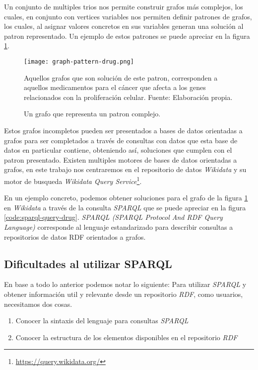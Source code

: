 Un conjunto de multiples trios nos permite construir grafos más complejos, los cuales, en conjunto con vertices variables nos permiten definir patrones de grafos, los cuales, al asignar valores concretos en sus variables generan una solución al patron representado. Un ejemplo de estos patrones se puede apreciar en la figura \ref{fig:rdf-graph-pattern-drug}.

\begin{figure}[ht]
    \centering
    \texttt{[image: graph-pattern-drug.png]}
    \caption{Un grafo que representa un patron complejo.} Aquellos grafos que son solución de este patron, corresponden a aquellos medicamentos para el cáncer que afecta a los genes relacionados con la proliferación celular. Fuente: Elaboración propia.
    \label{fig:rdf-graph-pattern-drug}
\end{figure}

Estos grafos incompletos pueden ser presentados a bases de datos orientadas a grafos para ser completados a través de consultas con datos que esta base de datos en particular contiene, obteniendo así, soluciones que cumplen con el patron presentado. Existen multiples motores de bases de datos orientadas a grafos, en este trabajo nos centraremos en el repositorio de datos \textit{Wikidata} \cite{erxleben2014introducing} y su motor de busqueda \textit{Wikidata Query Service}\footnote{\href{https://query.wikidata.org/}{https://query.wikidata.org/}}.

En un ejemplo concreto, podemos obtener soluciones para el grafo de la figura \ref{fig:rdf-graph-pattern-drug} en \textit{Wikidata} a través de la consulta \textit{SPARQL} que se puede apreciar en la figura \ref{code:sparql-query-drug}. \textit{SPARQL (SPARQL Protocol And RDF Query Language)} corresponde al lenguaje estandarizado para describir consultas a repositorios de datos RDF orientados a grafos.

\subsection{Dificultades al utilizar SPARQL}

En base a todo lo anterior podemos notar lo siguiente: Para utilizar \textit{SPARQL} y obtener información util y relevante desde un repositorio \textit{RDF}, como usuarios, necesitamos dos cosas.

\begin{enumerate}
    \item Conocer la sintaxis del lenguaje para consultas \textit{SPARQL}
    \item Conocer la estructura de los elementos disponibles en el repositorio \textit{RDF}
\end{enumerate}

